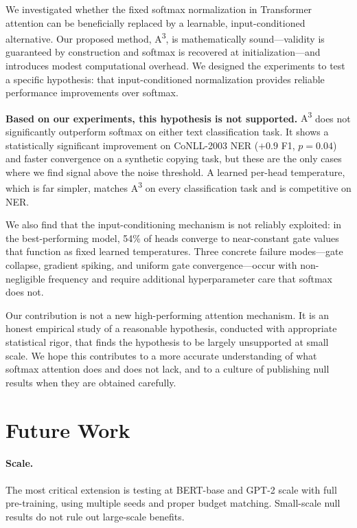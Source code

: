 \documentclass[11pt]{article}
\newcommand{\AAA}{\textsc{A\textsuperscript{3}}}
\begin{document}
We investigated whether the fixed softmax normalization in Transformer attention can be beneficially replaced by a learnable, input-conditioned alternative. Our proposed method, \AAA{}, is mathematically sound---validity is guaranteed by construction and softmax is recovered at initialization---and introduces modest computational overhead. We designed the experiments to test a specific hypothesis: that input-conditioned normalization provides reliable performance improvements over softmax.

\textbf{Based on our experiments, this hypothesis is not supported.} \AAA{} does not significantly outperform softmax on either text classification task. It shows a statistically significant improvement on CoNLL-2003 NER ($+0.9$ F1, $p = 0.04$) and faster convergence on a synthetic copying task, but these are the only cases where we find signal above the noise threshold. A learned per-head temperature, which is far simpler, matches \AAA{} on every classification task and is competitive on NER.

We also find that the input-conditioning mechanism is not reliably exploited: in the best-performing model, 54\% of heads converge to near-constant gate values that function as fixed learned temperatures. Three concrete failure modes---gate collapse, gradient spiking, and uniform gate convergence---occur with non-negligible frequency and require additional hyperparameter care that softmax does not.

Our contribution is not a new high-performing attention mechanism. It is an honest empirical study of a reasonable hypothesis, conducted with appropriate statistical rigor, that finds the hypothesis to be largely unsupported at small scale. We hope this contributes to a more accurate understanding of what softmax attention does and does not lack, and to a culture of publishing null results when they are obtained carefully.

\section{Future Work}
\label{sec:future}

\paragraph{Scale.} The most critical extension is testing at BERT-base and GPT-2 scale with full pre-training, using multiple seeds and proper budget matching. Small-scale null results do not rule out large-scale benefits.
\end{document}
